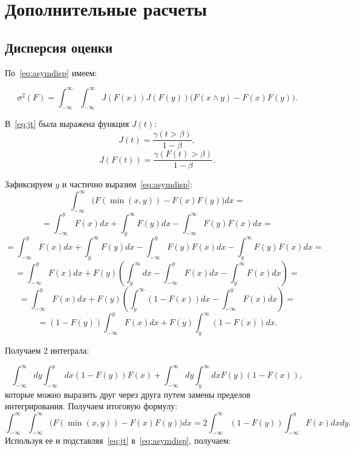 \documentclass[12pt, specialist, subf, substylefile = spbu.rtx]{disser}
\begin{document}




\newpage
\appendix
\chapter{Дополнительные расчеты}\label{sec:app_disp}

\section{Дисперсия оценки}

По~\eqref{eq:asymdisp} имеем:

$$
\sigma^2(F)= \int_{-\infty}^\infty \int_{-\infty}^\infty J(F(x)) J(F(y))\big( F(x \wedge y)-F(x)F(y)\big).
$$

В~\eqref{eq:jt} была выражена функция $J(t)$:
$$
J(t)=\frac{\gamma(t>\beta)}{1-\beta},
$$
$$
J(F(t))=\frac{\gamma(F(t)>\beta)}{1-\beta}.
$$

Зафиксируем $y$ и частично выразим~\eqref{eq:asymdisp}:
$$
\int_{-\infty}^\infty \big( F(\min(x, y))-F(x)F(y)\big)dx = 
$$
$$
=\int_{-\infty}^y F(x)dx + \int_y^\infty F(y)dx - 
\int_{-\infty}^\infty F(y)F(x)dx =
$$
$$
=\int_{-\infty}^y F(x)dx + \int_y^\infty F(y)dx - 
\int_{-\infty}^y F(y)F(x)dx -
\int_y^\infty F(y)F(x)dx =
$$
$$
=\int_{-\infty}^y F(x)dx + F(y) \left(
\int_y^\infty dx - 
\int_{-\infty}^y F(x)dx -
\int_y^\infty F(x)dx
\right)=
$$
$$
=
\int_{-\infty}^y F(x)dx + F(y) \left(
\int_y^\infty (1-F(x))dx - 
\int_{-\infty}^y F(x)dx
\right)=
$$
$$
=(1-F(y))\int_{-\infty}^y F(x)dx + 
F(y)\int_y^\infty (1-F(x))dx.
$$

Получаем 2 интеграла:

$$
\int_{-\infty}^\infty dy \int_{-\infty}^y dx (1-F(y))F(x) + 
\int_{-\infty}^\infty dy \int_y^\infty dx F(y)(1-F(x)),
$$
которые можно выразить друг через друга путем замены пределов интегрирования. Получаем итоговую формулу:
$$
\int_{-\infty}^\infty \int_{-\infty}^\infty 
\big( F(\min(x, y))-F(x)F(y)\big)dx = 
2\int_{-\infty}^\infty (1-F(y)) \int_{-\infty}^y F(x) dx dy.
$$
Используя ее и подставляя~\eqref{eq:jt} в~\eqref{eq:asymdisp}, получаем:
\end{document}
